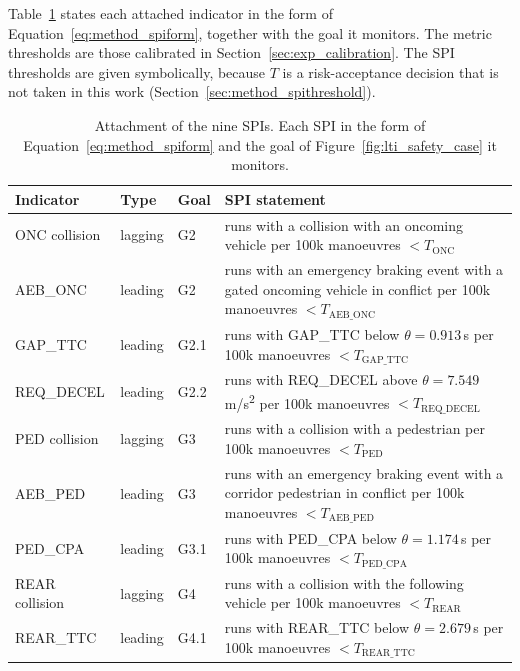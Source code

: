 Table~\ref{tab:spi_attachment} states each attached indicator in the form of
Equation~\eqref{eq:method_spiform}, together with the goal it monitors. The metric
thresholds are those calibrated in Section~\ref{sec:exp_calibration}. The SPI
thresholds are given symbolically, because $T$ is a risk-acceptance decision that
is not taken in this work (Section~\ref{sec:method_spithreshold}).

\begin{table}[htbp]
    \centering
    \caption[Attachment of the nine SPIs]{Attachment of the nine SPIs. Each SPI in the form of Equation~\eqref{eq:method_spiform} and the goal of Figure~\ref{fig:lti_safety_case} it monitors.}
    \label{tab:spi_attachment}
    \small
    \begin{tabular}{@{}l l l >{\raggedright\arraybackslash}p{8.6cm}@{}}
        \toprule
        \textbf{Indicator} & \textbf{Type} & \textbf{Goal} & \textbf{SPI statement} \\
        \midrule
        ONC collision & lagging & G2 & runs with a collision with an oncoming vehicle
        per 100k manoeuvres $< T_{\mathrm{ONC}}$ \\[2pt]
        AEB\_ONC & leading & G2 & runs with an emergency braking event with a gated
        oncoming vehicle in conflict per 100k manoeuvres $< T_{\mathrm{AEB\_ONC}}$ \\[2pt]
        GAP\_TTC & leading & G2.1 & runs with GAP\_TTC below $\theta = 0.913$\,s per
        100k manoeuvres $< T_{\mathrm{GAP\_TTC}}$ \\[2pt]
        REQ\_DECEL & leading & G2.2 & runs with REQ\_DECEL above
        $\theta = 7.549$\,m/s\textsuperscript{2} per 100k manoeuvres
        $< T_{\mathrm{REQ\_DECEL}}$ \\[2pt]
        PED collision & lagging & G3 & runs with a collision with a pedestrian per
        100k manoeuvres $< T_{\mathrm{PED}}$ \\[2pt]
        AEB\_PED & leading & G3 & runs with an emergency braking event with a corridor
        pedestrian in conflict per 100k manoeuvres $< T_{\mathrm{AEB\_PED}}$ \\[2pt]
        PED\_CPA & leading & G3.1 & runs with PED\_CPA below $\theta = 1.174$\,s per
        100k manoeuvres $< T_{\mathrm{PED\_CPA}}$ \\[2pt]
        REAR collision & lagging & G4 & runs with a collision with the following vehicle
        per 100k manoeuvres $< T_{\mathrm{REAR}}$ \\[2pt]
        REAR\_TTC & leading & G4.1 & runs with REAR\_TTC below $\theta = 2.679$\,s per
        100k manoeuvres $< T_{\mathrm{REAR\_TTC}}$ \\
        \bottomrule
    \end{tabular}
\end{table}

